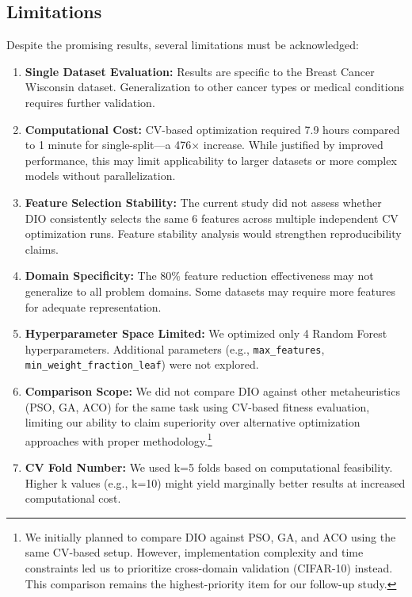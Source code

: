 \documentclass[12pt, a4paper]{article}
\begin{document}
\subsection{Limitations}
Despite the promising results, several limitations must be acknowledged:
\begin{enumerate}
    \item \textbf{Single Dataset Evaluation:} Results are specific to the Breast Cancer Wisconsin dataset. Generalization to other cancer types or medical conditions requires further validation.
    
    \item \textbf{Computational Cost:} CV-based optimization required 7.9 hours compared to 1 minute for single-split—a 476$\times$ increase. While justified by improved performance, this may limit applicability to larger datasets or more complex models without parallelization.
    
    \item \textbf{Feature Selection Stability:} The current study did not assess whether DIO consistently selects the same 6 features across multiple independent CV optimization runs. Feature stability analysis would strengthen reproducibility claims.
    
    \item \textbf{Domain Specificity:} The 80\% feature reduction effectiveness may not generalize to all problem domains. Some datasets may require more features for adequate representation.
    
    \item \textbf{Hyperparameter Space Limited:} We optimized only 4 Random Forest hyperparameters. Additional parameters (e.g., \texttt{max\_features}, \texttt{min\_weight\_fraction\_leaf}) were not explored.
    
    \item \textbf{Comparison Scope:} We did not compare DIO against other metaheuristics (PSO, GA, ACO) for the same task using CV-based fitness evaluation, limiting our ability to claim superiority over alternative optimization approaches with proper methodology.\footnote{We initially planned to compare DIO against PSO, GA, and ACO using the same CV-based setup. However, implementation complexity and time constraints led us to prioritize cross-domain validation (CIFAR-10) instead. This comparison remains the highest-priority item for our follow-up study.}
    
    \item \textbf{CV Fold Number:} We used k=5 folds based on computational feasibility. Higher k values (e.g., k=10) might yield marginally better results at increased computational cost.
\end{enumerate}
\end{document}
